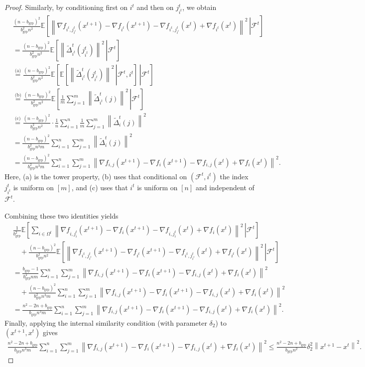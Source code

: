 \documentclass{article}
\newcommand{\eqtext}[1]{\ensuremath{\stackrel{\text{#1}}{=}}}
\newcommand{\sqn}[1]{\left\| #1 \right\|^2}
\newcommand{\Expb}[2]{\mathbb{E}\!\left[\left. #1\,\right|#2 \right]}
\newcommand{\Expc}[1]{\Expb{#1}{\mathcal{F}^t}}
\theoremstyle{plain}
\begin{document}
\begin{proof}
Similarly, by conditioning first on $i^t$ and then on $j_{i^t}^t$, we obtain
\begin{align*}
&\frac{(n-b_{\mathrm{grp}})^2}{b_{\mathrm{grp}}^2n^2}\Expc{ \sqn{ \nabla f_{i^t,j_{i^t}^t}(x^{t+1})-\nabla f_{i^t}(x^{t+1})-\nabla f_{i^t,j_{i^t}^t}(x^{t})+\nabla f_{i^t}(x^t)}}\\
&=\frac{(n-b_{\mathrm{grp}})^2}{b_{\mathrm{grp}}^2n^2}\Expc{\sqn{\widetilde{\Delta}_{i^t}^t(j_{i^t}^t)}}\\
&\eqtext{(a)}\frac{(n-b_{\mathrm{grp}})^2}{b_{\mathrm{grp}}^2n^2}\Expb{\Expb{\sqn{\widetilde{\Delta}_{i^t}^t(j_{i^t}^t)}}{\mathcal{F}^t,i^t}}{\mathcal{F}^t}\\
&\eqtext{(b)}\frac{(n-b_{\mathrm{grp}})^2}{b_{\mathrm{grp}}^2n^2}\Expb{\frac{1}{m}\sum_{j=1}^m \sqn{\widetilde{\Delta}_{i^t}^t(j)}}{\mathcal{F}^t}\\
&\eqtext{(c)}\frac{(n-b_{\mathrm{grp}})^2}{b_{\mathrm{grp}}^2n^2}\cdot \frac{1}{n}\sum_{i=1}^n \frac{1}{m}\sum_{j=1}^m \sqn{\widetilde{\Delta}_i^t(j)}\\
&=\frac{(n-b_{\mathrm{grp}})^2}{b_{\mathrm{grp}}^2n^3m}\sum_{i=1}^n\sum_{j=1}^m \sqn{\widetilde{\Delta}_i^t(j)}\\
&=\frac{(n-b_{\mathrm{grp}})^2}{b_{\mathrm{grp}}^2n^3m}\sum_{i=1}^n\sum_{j=1}^m
\sqn{\nabla f_{i,j}(x^{t+1})-\nabla f_i(x^{t+1})-\nabla f_{i,j}(x^{t})+\nabla f_i(x^{t})}.
\end{align*}
Here, (a) is the tower property, (b) uses that conditional on $(\mathcal{F}^t,i^t)$ the index $j_{i^t}^t$ is uniform on $[m]$,
and (c) uses that $i^t$ is uniform on $[n]$ and independent of $\mathcal{F}^t$.


Combining these two identities yields
\begin{align*}
&\frac{1}{b_{\mathrm{grp}}^2}\Expc{ \sum_{i\in \Omega^t}\sqn{ \nabla f_{i,j_i^t}(x^{t+1})-\nabla f_i(x^{t+1})-\nabla f_{i,j_i^t}(x^{t})+\nabla f_i(x^t)}} \\
&\quad+\frac{(n-b_{\mathrm{grp}})^2}{b_{\mathrm{grp}}^2n^2}\Expc{ \sqn{ \nabla f_{i^t,j_{i^t}^t}(x^{t+1})-\nabla f_{i^t}(x^{t+1})-\nabla f_{i^t,j_{i^t}^t}(x^{t})+\nabla f_{i^t}(x^t)}}\\
&=\frac{b_{\mathrm{grp}}-1}{b_{\mathrm{grp}}^2nm}\sum_{i=1}^n\sum_{j=1}^m\sqn{\nabla f_{i,j}(x^{t+1})-\nabla f_i(x^{t+1})-\nabla f_{i,j}(x^{t})+\nabla f_i(x^{t})} \\
&\quad+\frac{(n-b_{\mathrm{grp}})^2}{b_{\mathrm{grp}}^2n^3m}\sum_{i=1}^n\sum_{j=1}^m\sqn{\nabla f_{i,j}(x^{t+1})-\nabla f_i(x^{t+1})-\nabla f_{i,j}(x^{t})+\nabla f_i(x^{t})}\\
&=\frac{n^2-2n+b_{\mathrm{grp}}}{b_{\mathrm{grp}}n^3m}\sum_{i=1}^n\sum_{j=1}^m\sqn{\nabla f_{i,j}(x^{t+1})-\nabla f_i(x^{t+1})-\nabla f_{i,j}(x^{t})+\nabla f_i(x^{t})}.
\end{align*}
Finally, applying the internal similarity condition (with parameter $\delta_2$) to $(x^{t+1},x^t)$ gives
\begin{align*}
\frac{n^2-2n+b_{\mathrm{grp}}}{b_{\mathrm{grp}}n^3m}\sum_{i=1}^n\sum_{j=1}^m\sqn{\nabla f_{i,j}(x^{t+1})-\nabla f_i(x^{t+1})-\nabla f_{i,j}(x^{t})+\nabla f_i(x^{t})}
\leq\frac{n^2-2n+b_{\mathrm{grp}}}{b_{\mathrm{grp}}n^2}\delta_2^2\sqn{x^{t+1}-x^t}.
\end{align*}


\end{proof}
\end{document}
